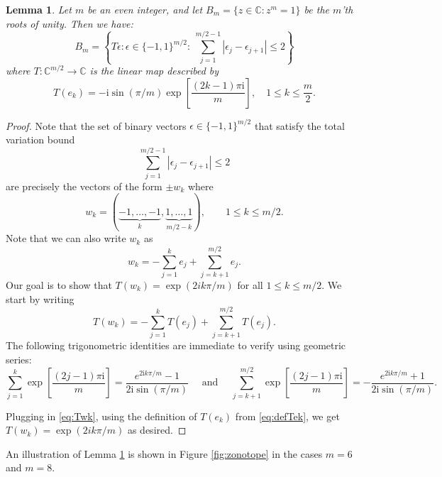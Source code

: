 \documentclass{article}
\newcommand{\CC}{\mathbb{C}}
\newtheorem{lemma}{Lemma}
\theoremstyle{definition}
\renewcommand{\i}{\mathrm{i}}
\begin{document}
\begin{lemma}\label{lem:zonotope_map}
    Let $m$ be an even integer, and let $B_m = \{z \in \CC : z^m=1\}$ be the $m$'th roots of unity. Then we have:
    \[
    B_m = \left\{T \epsilon : \epsilon \in \{-1,1\}^{m/2}:~\sum_{j=1}^{m/2-1} |\epsilon_j - \epsilon_{j+1}| \leq 2\right\}
    \]
    where $T:\CC^{m/2}\to \CC$ is the linear map described by
    \begin{equation}
        \label{eq:defTek}
    T(e_k) = -\i \sin(\pi/m) \exp\left[\frac{(2k-1)\pi\i}{m}\right],\quad 1\le k\le \frac{m}{2}.
    \end{equation}
\end{lemma}
\begin{proof}
    Note that the set of binary vectors $\epsilon \in \{-1,1\}^{m/2}$ that satisfy the total variation bound
    \[
    \sum_{j=1}^{m/2-1} |\epsilon_j - \epsilon_{j+1}| \leq 2
    \]
are precisely the vectors of the form $\pm w_k$ where
\[
w_k = (\underbrace{-1,\ldots,-1}_{k},\underbrace{1,\ldots,1}_{m/2-k}), \qquad 1\leq k \leq m/2.
\]
Note that we can also write $w_k$ as
\[
w_k = -\sum_{j=1}^k e_j + \sum_{j=k+1}^{m/2} e_j.
\]
Our goal is to show that $T(w_k) = \exp(2ik\pi /m)$ for all $1\leq k \leq m/2$. We start by writing
\begin{equation}
\label{eq:Twk}
T(w_k) = -\sum_{j=1}^k T(e_j) + \sum_{j=k+1}^{m/2} T(e_j).
\end{equation}
The following trigonometric identities are immediate to verify using geometric series: 
\[
\sum_{j=1}^k \exp\left[\frac{(2j-1)\pi\i}{m}\right] = \frac{e^{2\i k \pi /m} - 1}{2 \i \sin(\pi/m)}
\quad
\text{ and }
\quad
\sum_{j=k+1}^{m/2} \exp\left[\frac{(2j-1)\pi\i}{m}\right] = -\frac{e^{2\i k \pi /m} + 1}{2 \i \sin(\pi/m)}.
\]


Plugging in \eqref{eq:Twk}, using the definition of $T(e_k)$ from \eqref{eq:defTek}, we get $T(w_k) = \exp(2ik\pi/m)$ as desired.
\end{proof}

An illustration of Lemma \ref{lem:zonotope_map} is shown in Figure \ref{fig:zonotope} in the cases $m=6$ and $m=8$. 
\end{document}
